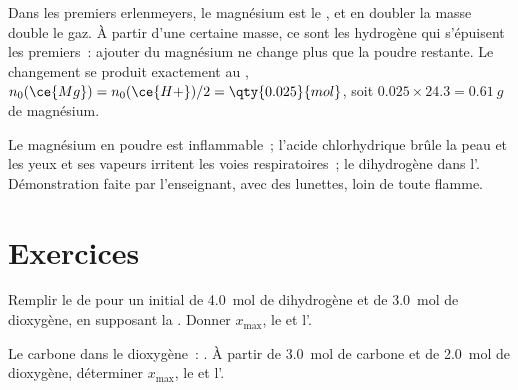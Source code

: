 \begin{remark}\label{rem:g10:reaction-progress-table:plateau}
Dans les premiers erlenmeyers, le magnésium est le , et
en doubler la masse double le gaz. À partir d'une certaine masse, ce
sont les  hydrogène qui s'épuisent les premiers~: ajouter du
magnésium ne change plus que la poudre restante. Le changement se
produit exactement au ,
$n_0(\ce{Mg}) = n_0(\ce{H+})/2 = \qty{0.025}{mol}$, soit
$0.025 \times 24.3 = \qty{0.61}{g}$ de magnésium.
\end{remark}

\begin{safety}{}
Le magnésium en poudre est inflammable~; l'acide chlorhydrique brûle la
peau et les yeux et ses vapeurs irritent les voies respiratoires~; le
dihydrogène  dans l'. Démonstration faite par l'enseignant, avec
des lunettes, loin de toute flamme.
\end{safety}

\section{Exercices}

\begin{exercise}[$\star$]\label{exo:g10:reaction-progress-table:1}
Remplir le  de  pour un 
initial de \qty{4.0}{mol} de dihydrogène et de \qty{3.0}{mol} de
dioxygène, en supposant la . Donner $x_{\max}$, le
 et l'.
\end{exercise}

\begin{exercise}[$\star$]\label{exo:g10:reaction-progress-table:2}
Le carbone  dans le dioxygène~: . À partir de
\qty{3.0}{mol} de carbone et de \qty{2.0}{mol} de dioxygène, déterminer
$x_{\max}$, le  et l'.
\end{exercise}


